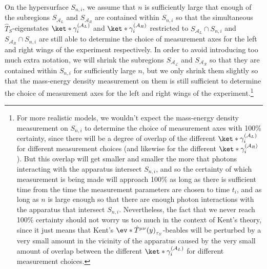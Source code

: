\documentclass[12pt]{report}
\begin{document}
On the hypersurface $S_{n,i}$, we assume that $n$ is sufficiently large that enough of the subregions $S_{\mathcal{A}_L}$ and $S_{\mathcal{A}_R}$ are contained within $S_{n,i}$ so that the simultaneous $\hat{T}_S$-eigenstates $\ket*{\gamma_i^{(\mathcal{A}_L)}}$ and $\ket*{\gamma_i^{(\mathcal{A}_R)}}$ restricted to $S_{\mathcal{A}_L}\cap S_{n,i}$ and $S_{\mathcal{A}_R}\cap S_{n,i}$ are still able to determine the choice of measurement axes for the left and right wings of the experiment respectively. In order to avoid introducing too much extra notation, we will shrink the subregions $S_{\mathcal{A_L}}$ and $S_{\mathcal{A_R}}$ so that they are contained within $S_{n,i}$ for sufficiently large $n$, but we only shrink them slightly so that the mass-energy density measurement on them is still sufficient to determine the choice of measurement axes for the left and right wings of the experiment.\footnote{For more realistic models, we wouldn't expect the mass-energy density measurement on $S_{n,i}$ to determine the choice of measurement axes with 100\% certainty, since there will be a degree of overlap of the different $\ket*{\gamma_i^{(\mathcal{A}_L)}}$ for different measurement choices (and likewise for the different $\ket*{\gamma_i^{(\mathcal{A}_R)}}$). But this overlap will get smaller and smaller the more that photons interacting with the apparatus intersect $S_{n,i}$, and so the certainty of which measurement is being made will approach 100\% as long as there is sufficient time from the time the measurement parameters are chosen to time $t_i$, and as long as $n$ is large enough so that there are enough photon interactions with the apparatus that intersect $S_{n,i}$. Nevertheless, the fact that we never reach 100\% certainty should not worry us too much in the context of Kent's theory, since it just means that Kent's $\ev*{\hat{T}^{\mu\nu}(y)}_{\tau_S}$-beables will be perturbed by a very small amount in the vicinity of the apparatus caused by the very small amount of overlap between the different $\ket*{\gamma_i^{(\mathcal{A}_L)}}$ for different measurement choices. }   
\end{document}
